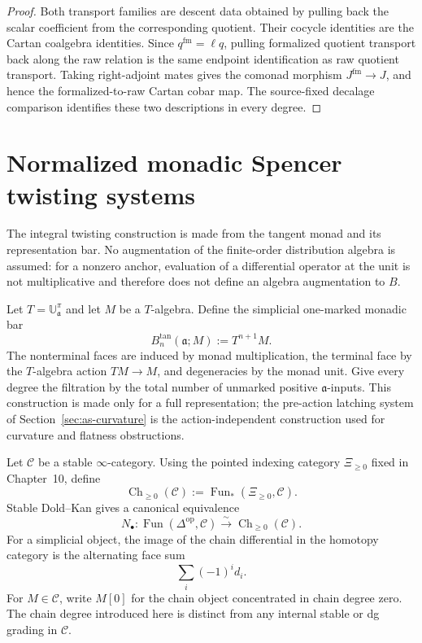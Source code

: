 \begin{proof}
Both transport families are descent data obtained by pulling back the scalar
coefficient from the corresponding quotient.  Their cocycle identities are
the Cartan coalgebra identities.  Since
$q^{\mathrm{fm}}=\ell q$, pulling formalized quotient transport back along the
raw relation is the same endpoint identification as raw quotient transport.
Taking right-adjoint mates gives the comonad morphism
$J^{\mathrm{fm}}\to J$, and hence the formalized-to-raw Cartan cobar map.
The source-fixed decalage comparison identifies these two descriptions in
every degree.
\end{proof}

\section{Normalized monadic Spencer twisting systems}
\label{sec:as-twisting}

The integral twisting construction is made from the tangent monad and its
representation bar.  No augmentation of the finite-order distribution
algebra is assumed: for a nonzero anchor, evaluation of a differential
operator at the unit is not multiplicative and therefore does not define an
algebra augmentation to $B$.

\begin{definition}
\label{def:as-tangent-marked-bar}
Let $T=\mathbb U_{\mathfrak a}^{\pi}$ and let $M$ be a $T$-algebra.  Define
the simplicial one-marked monadic bar
\[
\boxed{
    B_n^{\mathrm{tan}}(\mathfrak a;M):=T^{n+1}M.
}
\]
The nonterminal faces are induced by monad multiplication, the terminal face
by the $T$-algebra action $TM\to M$, and degeneracies by the monad unit.
Give every degree the filtration by the total number of unmarked positive
$\mathfrak a$-inputs.  This construction is made only for a full
representation; the pre-action latching system of
Section~\ref{sec:as-curvature} is the action-independent construction used
for curvature and flatness obstructions.
\end{definition}

\begin{definition}
\label{def:as-stable-chain-normalization}
Let $\mathcal C$ be a stable $\infty$-category.  Using the pointed indexing
category $\Xi_{\geq0}$ fixed in Chapter~10, define
\[
\boxed{
    \operatorname{Ch}_{\geq0}(\mathcal C)
    :=
    \operatorname{Fun}_*(\Xi_{\geq0},\mathcal C).
}
\]
Stable Dold--Kan gives a canonical equivalence
\[
\boxed{
    N_\bullet:
    \operatorname{Fun}(\Delta^{\mathrm{op}},\mathcal C)
    \xrightarrow{\sim}
    \operatorname{Ch}_{\geq0}(\mathcal C).
}
\]
For a simplicial object, the image of the chain differential in the homotopy
category is the alternating face sum
\[
    \sum_i(-1)^i d_i.
\]
For $M\in\mathcal C$, write $M[0]$ for the chain object concentrated in chain
degree zero.  The chain degree introduced here is distinct from any internal
stable or dg grading in $\mathcal C$.
\end{definition}

